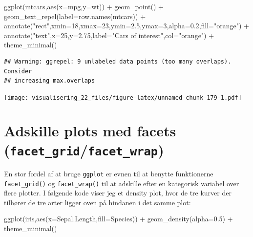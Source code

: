 \documentclass[
]{book}
\newenvironment{Shaded}{\begin{snugshade}}{\end{snugshade}}
\newcommand{\AttributeTok}[1]{\textcolor[rgb]{0.77,0.63,0.00}{#1}}
\newcommand{\DecValTok}[1]{\textcolor[rgb]{0.00,0.00,0.81}{#1}}
\newcommand{\FloatTok}[1]{\textcolor[rgb]{0.00,0.00,0.81}{#1}}
\newcommand{\FunctionTok}[1]{\textcolor[rgb]{0.00,0.00,0.00}{#1}}
\newcommand{\NormalTok}[1]{#1}
\newcommand{\SpecialCharTok}[1]{\textcolor[rgb]{0.00,0.00,0.00}{#1}}
\newcommand{\StringTok}[1]{\textcolor[rgb]{0.31,0.60,0.02}{#1}}
\begin{document}
\begin{Shaded}
\begin{Highlighting}[]
\FunctionTok{ggplot}\NormalTok{(mtcars,}\FunctionTok{aes}\NormalTok{(}\AttributeTok{x=}\NormalTok{mpg,}\AttributeTok{y=}\NormalTok{wt)) }\SpecialCharTok{+} 
  \FunctionTok{geom\_point}\NormalTok{() }\SpecialCharTok{+}
  \FunctionTok{geom\_text\_repel}\NormalTok{(}\AttributeTok{label=}\FunctionTok{row.names}\NormalTok{(mtcars)) }\SpecialCharTok{+}
  \FunctionTok{annotate}\NormalTok{(}\StringTok{"rect"}\NormalTok{,}\AttributeTok{xmin=}\DecValTok{18}\NormalTok{,}\AttributeTok{xmax=}\DecValTok{23}\NormalTok{,}\AttributeTok{ymin=}\FloatTok{2.5}\NormalTok{,}\AttributeTok{ymax=}\DecValTok{3}\NormalTok{,}\AttributeTok{alpha=}\FloatTok{0.2}\NormalTok{,}\AttributeTok{fill=}\StringTok{"orange"}\NormalTok{) }\SpecialCharTok{+}
  \FunctionTok{annotate}\NormalTok{(}\StringTok{"text"}\NormalTok{,}\AttributeTok{x=}\DecValTok{25}\NormalTok{,}\AttributeTok{y=}\FloatTok{2.75}\NormalTok{,}\AttributeTok{label=}\StringTok{"Cars of interest"}\NormalTok{,}\AttributeTok{col=}\StringTok{"orange"}\NormalTok{) }\SpecialCharTok{+} 
  \FunctionTok{theme\_minimal}\NormalTok{()}
\end{Highlighting}
\end{Shaded}

\begin{verbatim}
## Warning: ggrepel: 9 unlabeled data points (too many overlaps). Consider
## increasing max.overlaps
\end{verbatim}

\texttt{[image: visualisering\_22\_files/figure-latex/unnamed-chunk-179-1.pdf]}

\hypertarget{adskille-plots-med-facets-facet_gridfacet_wrap}{%
\section{\texorpdfstring{Adskille plots med facets (\texttt{facet\_grid}/\texttt{facet\_wrap})}{Adskille plots med facets (facet\_grid/facet\_wrap)}}\label{adskille-plots-med-facets-facet_gridfacet_wrap}}

En stor fordel af at bruge \texttt{ggplot} er evnen til at benytte funktionerne \texttt{facet\_grid()} og \texttt{facet\_wrap()} til at adskille efter en kategorisk variabel over flere plotter. I følgende kode viser jeg et density plot, hvor de tre kurver der tilhører de tre arter ligger oven på hindanen i det samme plot:

\begin{Shaded}
\begin{Highlighting}[]
\FunctionTok{ggplot}\NormalTok{(iris,}\FunctionTok{aes}\NormalTok{(}\AttributeTok{x=}\NormalTok{Sepal.Length,}\AttributeTok{fill=}\NormalTok{Species)) }\SpecialCharTok{+} 
  \FunctionTok{geom\_density}\NormalTok{(}\AttributeTok{alpha=}\FloatTok{0.5}\NormalTok{) }\SpecialCharTok{+} 
  \FunctionTok{theme\_minimal}\NormalTok{()}
\end{Highlighting}
\end{Shaded}
\end{document}
